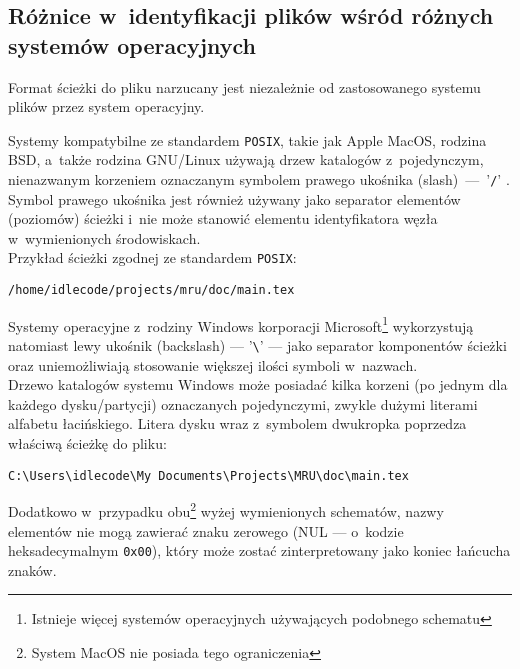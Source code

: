 \subsection{Różnice w~identyfikacji plików wśród różnych systemów operacyjnych}
\par
Format ścieżki do pliku narzucany jest niezależnie od zastosowanego systemu plików przez system operacyjny.

\par
Systemy kompatybilne ze standardem \texttt{POSIX}, takie jak Apple MacOS, rodzina BSD, a~także rodzina GNU/Linux używają drzew katalogów z~pojedynczym, nienazwanym korzeniem oznaczanym symbolem prawego ukośnika (slash)~---~'\texttt{/}' \cite{website:posix-standard}.\\
Symbol prawego ukośnika jest również używany jako separator elementów (poziomów) ścieżki i~nie może stanowić elementu identyfikatora węzła w~wymienionych środowiskach.\\
Przykład ścieżki zgodnej ze standardem \texttt{POSIX}:
\begin{center}
\texttt{/home/idlecode/projects/mru/doc/main.tex}
\end{center}

\par
Systemy operacyjne z~rodziny Windows korporacji Microsoft\footnote{Istnieje  więcej systemów operacyjnych używających podobnego schematu} wykorzystują natomiast lewy ukośnik (backslash) --- '\texttt{\textbackslash}' --- jako separator komponentów ścieżki oraz uniemożliwiają stosowanie większej ilości symboli w~nazwach.\\
Drzewo katalogów systemu Windows może posiadać kilka korzeni (po jednym dla każdego dysku/partycji) oznaczanych pojedynczymi, zwykle dużymi literami alfabetu łacińskiego. Litera dysku wraz z~symbolem dwukropka poprzedza właściwą ścieżkę do pliku:\\
\begin{center}
\texttt{C:\textbackslash Users\textbackslash idlecode\textbackslash My Documents\textbackslash Projects\textbackslash MRU\textbackslash doc\textbackslash main.tex}
\end{center}

\par
Dodatkowo w~przypadku obu\footnote{System MacOS nie posiada tego ograniczenia} wyżej wymienionych schematów, nazwy elementów nie mogą zawierać znaku zerowego (NUL --- o~kodzie heksadecymalnym \texttt{0x00}), który może zostać zinterpretowany jako koniec łańcucha znaków\cite{website:fixing-unix-linux-filenames}.

